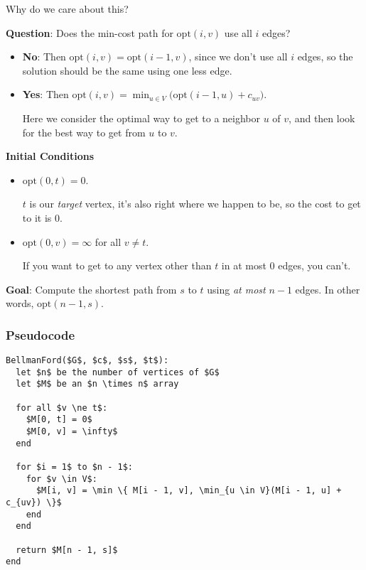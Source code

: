 \documentclass[12pt]{article}
\def\opt{\text{opt}}
\begin{document}
  \QUESTION{} Why do we care about this?

  {\bf Question}: Does the min-cost path for $\opt(i, v)$ use all $i$ edges?

  \begin{itemize}
    \item {\bf No}: Then $\opt(i, v) = \opt(i - 1, v)$, since we don't use all
      $i$ edges, so the solution should be the same using one less edge.

    \item {\bf Yes}: Then $\opt(i, v) = \min_{u \in V}\big(\opt(i - 1, u) +
      c_{uv}\big)$.

      Here we consider the optimal way to get to a neighbor $u$ of $v$, and then
      look for the best way to get from $u$ to $v$.
  \end{itemize}


  {\bf Initial Conditions}

  \begin{itemize}
    \item $\opt(0, t) = 0$.

      $t$ is our {\it target} vertex, it's also right where we happen to be, so
      the cost to get to it is $0$.

    \item $\opt(0, v) = \infty$ for all $v \ne t$.

      If you want to get to any vertex other than $t$ in at most $0$ edges, you
      can't.

  \end{itemize}

  {\bf Goal}: Compute the shortest path from $s$ to $t$ using {\it at most} $n -
  1$ edges. In other words, $\opt(n - 1, s)$.

  \subsubsection{Pseudocode}

  \begin{lstlisting}
BellmanFord($G$, $c$, $s$, $t$):
  let $n$ be the number of vertices of $G$
  let $M$ be an $n \times n$ array

  for all $v \ne t$:
    $M[0, t] = 0$ 
    $M[0, v] = \infty$ 
  end

  for $i = 1$ to $n - 1$:
    for $v \in V$:
      $M[i, v] = \min \{ M[i - 1, v], \min_{u \in V}(M[i - 1, u] + c_{uv}) \}$
    end
  end

  return $M[n - 1, s]$
end
  \end{lstlisting}
\end{document}
